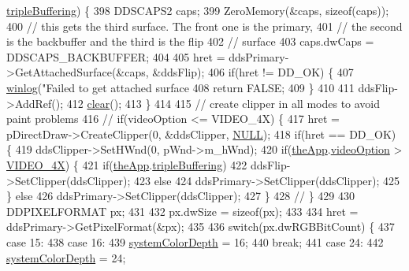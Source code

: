 \begin{DoxyCode}
{{{{{{{{{{{      \mbox{\hyperlink{class_v_b_a_af597e2c2466efdc6365a5d725651b855}{tripleBuffering}}) \{
398     DDSCAPS2 caps;
399     ZeroMemory(&caps, \textcolor{keyword}{sizeof}(caps));
400     \textcolor{comment}{// this gets the third surface. The front one is the primary,}
401     \textcolor{comment}{// the second is the backbuffer and the third is the flip}
402     \textcolor{comment}{// surface}
403     caps.dwCaps = DDSCAPS\_BACKBUFFER;
404     
405     hret = ddsPrimary->GetAttachedSurface(&caps, &ddsFlip);
406     \textcolor{keywordflow}{if}(hret != DD\_OK) \{
407       \mbox{\hyperlink{_direct_draw_8cpp_aceca31284db939464c9dc0fb15c92786}{winlog}}(\textcolor{stringliteral}{"Failed to get attached surface %
408       \textcolor{keywordflow}{return} FALSE;
409     \}
410 
411     ddsFlip->AddRef();
412     \mbox{\hyperlink{class_direct_draw_display_a90c0576a1ad6b80c1377df94d4eaa1a2}{clear}}();
413   \}
414 
415   \textcolor{comment}{// create clipper in all modes to avoid paint problems}
416   \textcolor{comment}{//  if(videoOption <= VIDEO\_4X) \{}
417   hret = pDirectDraw->CreateClipper(0, &ddsClipper, \mbox{\hyperlink{getopt1_8c_a070d2ce7b6bb7e5c05602aa8c308d0c4}{NULL}});
418   \textcolor{keywordflow}{if}(hret == DD\_OK) \{
419     ddsClipper->SetHWnd(0, pWnd->m\_hWnd);
420     \textcolor{keywordflow}{if}(\mbox{\hyperlink{_v_b_a_8cpp_a8095a9d06b37a7efe3723f3218ad8fb3}{theApp}}.\mbox{\hyperlink{class_v_b_a_a17dac073149c897f770c00ed7098ad32}{videoOption}} > \mbox{\hyperlink{_v_b_a_8h_a531c35e38ede3ea4e5ba5afb24b29493a6468bce6b84e6350d3de126f257eb38d}{VIDEO\_4X}}) \{
421       \textcolor{keywordflow}{if}(\mbox{\hyperlink{_v_b_a_8cpp_a8095a9d06b37a7efe3723f3218ad8fb3}{theApp}}.\mbox{\hyperlink{class_v_b_a_af597e2c2466efdc6365a5d725651b855}{tripleBuffering}})
422         ddsFlip->SetClipper(ddsClipper);
423       \textcolor{keywordflow}{else}
424         ddsPrimary->SetClipper(ddsClipper);
425     \} \textcolor{keywordflow}{else}
426       ddsPrimary->SetClipper(ddsClipper);
427   \}
428   \textcolor{comment}{//  \}}
429 
430   DDPIXELFORMAT px;
431 
432   px.dwSize = \textcolor{keyword}{sizeof}(px);
433 
434   hret = ddsPrimary->GetPixelFormat(&px);
435 
436   \textcolor{keywordflow}{switch}(px.dwRGBBitCount) \{
437   \textcolor{keywordflow}{case} 15:
438   \textcolor{keywordflow}{case} 16:
439     \mbox{\hyperlink{system_8cpp_adaf454a4617a00b5cfed14c203ab6efa}{systemColorDepth}} = 16;
440     \textcolor{keywordflow}{break};
441   \textcolor{keywordflow}{case} 24:
442     \mbox{\hyperlink{system_8cpp_adaf454a4617a00b5cfed14c203ab6efa}{systemColorDepth}} = 24;
}}}}}}}}}}}}
\end{DoxyCode}
